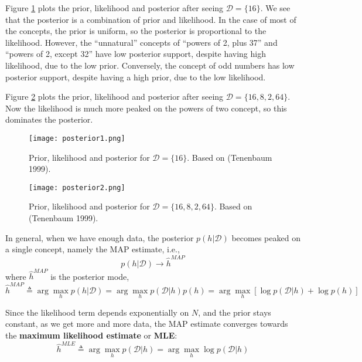 Figure \ref{fig:posterior1} plots the prior, likelihood and posterior after seeing $\mathcal{D}=\{16\}$. We see that the posterior is a combination of prior and likelihood. In the case of most of the concepts, the prior is uniform, so the posterior is proportional to the likelihood. However, the “unnatural” concepts of “powers of 2, plus 37” and “powers of 2, except 32” have low posterior support, despite having high likelihood, due to the low prior. Conversely, the concept of odd numbers has low posterior support, despite having a high prior, due to the low likelihood.

Figure \ref{fig:posterior2} plots the prior, likelihood and posterior after seeing $\mathcal{D}=\{16,8,2,64\}$. Now the likelihood is much more peaked on the powers of two concept, so this dominates the posterior.

\begin{figure}[hbtp]
\centering
    \texttt{[image: posterior1.png]}
\caption{Prior, likelihood and posterior for $\mathcal{D}=\{16\}$. Based on (Tenenbaum 1999).}
\label{fig:posterior1} 
\end{figure}

\begin{figure}[hbtp]
\centering
    \texttt{[image: posterior2.png]}
\caption{Prior, likelihood and posterior for $\mathcal{D}=\{16,8,2,64\}$. Based on (Tenenbaum 1999).}
\label{fig:posterior2} 
\end{figure}

In general, when we have enough data, the posterior $p(h|\mathcal{D})$ becomes peaked on a single concept, namely the MAP estimate, i.e.,
\begin{equation}
p(h|\mathcal{D}) \rightarrow \hat{h}^{MAP}
\end{equation}
where $\hat{h}^{MAP}$ is the posterior mode,
\begin{equation}
\hat{h}^{MAP} \triangleq \arg\max\limits_h p(h|\mathcal{D})=\arg\max\limits_h p(\mathcal{D}|h)p(h)=\arg\max\limits_h [\log p(\mathcal{D}|h) + \log p(h)]
\end{equation}

Since the likelihood term depends exponentially on $N$, and the prior stays constant, as we get more and more data, the MAP estimate converges towards the \textbf{maximum likelihood estimate} or \textbf{MLE}:
\begin{equation}
\hat{h}^{MLE} \triangleq \arg\max\limits_h p(\mathcal{D}|h)=\arg\max\limits_h \log p(\mathcal{D}|h)
\end{equation}

